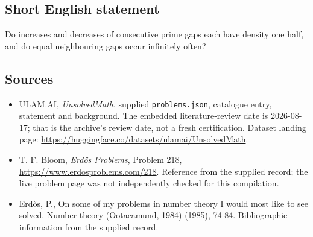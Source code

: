 \documentclass[11pt,a4paper]{article}
\begin{document}
\subsection{Short English statement}

Do increases and decreases of consecutive prime gaps each have density one half, and do equal neighbouring gaps occur infinitely often?

\subsection{Sources}

{\small

\begin{itemize}

\item[\hypertarget{source:statement:1}{S1}] ULAM.AI, \emph{UnsolvedMath}, supplied \texttt{problems.json}, catalogue entry, statement and background. The embedded literature-review date is 2026-08-17; that is the archive’s review date, not a fresh certification. Dataset landing page: \url{https://huggingface.co/datasets/ulamai/UnsolvedMath}.

\item[\hypertarget{source:statement:2}{S2}] T. F. Bloom, \emph{Erdős Problems}, Problem 218, \url{https://www.erdosproblems.com/218}. Reference from the supplied record; the live problem page was not independently checked for this compilation.

\item[\hypertarget{source:statement:3}{S3}] Erd\H{o}s, P., On some of my problems in number theory I would most like to see solved. Number theory (Ootacamund, 1984) (1985), 74-84. Bibliographic information from the supplied record.

\end{itemize}

}

\label{end:statement}
\end{document}
